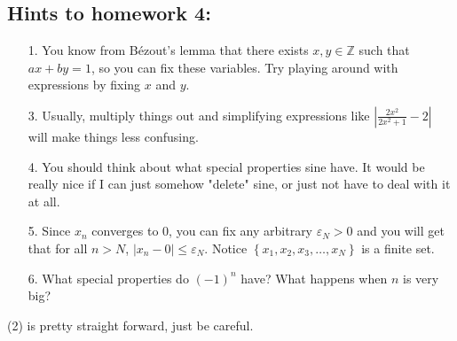 \documentclass[letterpaper,12pt]{article}
\newcommand{\set}[1]{\left\{ #1 \right\}}
\begin{document}
\subsection*{Hints to homework 4:}
\begin{enumerate}
\item[1.] You know from Bézout's lemma that there exists $x,y \in \mathbb{Z}$ such that $ax + by = 1$, so you can fix these variables. Try playing around with expressions by fixing $x$ and $y$.
\item[3.] Usually, multiply things out and simplifying expressions like $|\frac{2x^2}{2x^2 + 1}-2|$ will make things less confusing. 
\item[4.] You should think about what special properties sine have. It would be really nice if I can just somehow "delete" sine, or just not have to deal with it at all.
\item[5.] Since $x_n$ converges to 0, you can fix any arbitrary $\varepsilon_N > 0$ and you will get that for all $n > N$, $|x_n - 0 | \leq \varepsilon_N$. Notice $\set{x_1,x_2,x_3,\ldots,x_N}$ is a finite set.
\item[6.] What special properties do $(-1)^n$ have? What happens when $n$ is very big?
\end{enumerate}
(2) is pretty straight forward, just be careful.
\end{document}
